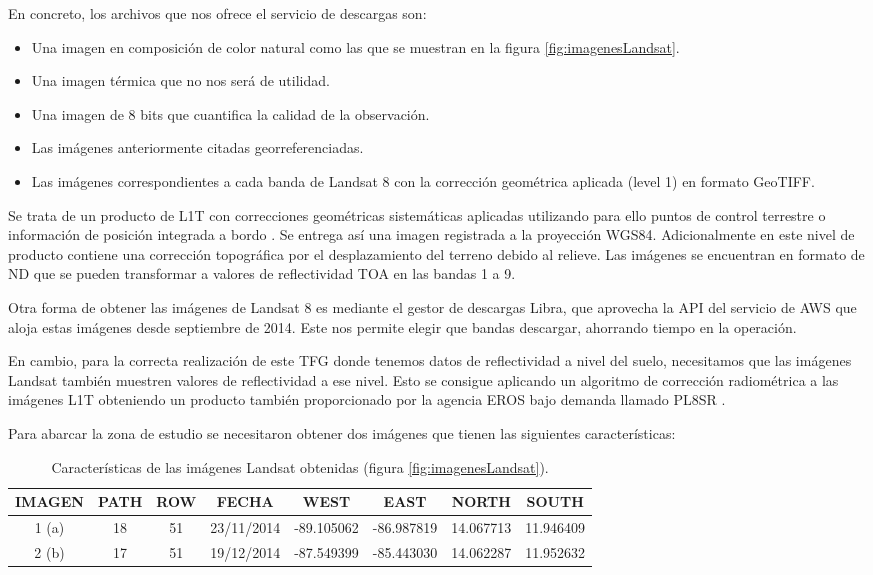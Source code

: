 En concreto, los archivos que nos ofrece el servicio de descargas son:

\begin{itemize}
	\item Una imagen en composición de color natural como las que se muestran en la figura \ref{fig:imagenesLandsat}.
	\item Una imagen térmica que no nos será de utilidad.
	\item Una imagen de 8 bits que cuantifica la calidad de la observación.
	\item Las imágenes anteriormente citadas georreferenciadas.
	\item Las imágenes correspondientes a cada banda de Landsat 8 con la corrección geométrica aplicada (level 1) en formato GeoTIFF.
\end{itemize}\Sep

Se trata de un producto de \ac{L1T} con correcciones geométricas sistemáticas aplicadas utilizando para ello puntos de control terrestre o información de posición integrada a bordo \citep{Ariza2013}. Se entrega así una imagen registrada a la proyección WGS84. Adicionalmente en este nivel de producto contiene una corrección topográfica por el desplazamiento del terreno debido al relieve. Las imágenes se encuentran en formato de \ac{ND} que se pueden transformar a valores de reflectividad \ac{TOA} en las bandas 1 a 9.\Sep

Otra forma de obtener las imágenes de Landsat 8 es mediante el gestor de descargas Libra, que aprovecha la API del servicio de \ac{AWS} que aloja estas imágenes desde septiembre de 2014. Este nos permite elegir que bandas descargar, ahorrando tiempo en la operación.\Sep

En cambio, para la correcta realización de este \ac{TFG} donde tenemos datos de reflectividad a nivel del suelo, necesitamos que las imágenes Landsat también muestren valores de reflectividad a ese nivel. Esto se consigue aplicando un algoritmo de corrección radiométrica a las imágenes \ac{L1T} obteniendo un producto también proporcionado por la agencia \ac{EROS} bajo demanda llamado \ac{PL8SR} \citep{USGS2015}.\Sep

Para abarcar la zona de estudio se necesitaron obtener dos imágenes que tienen las siguientes características:

\begin{table}[ht]
	\centering
	\caption[Caracerísticas de las imágenes Landsat]{Características de las imágenes Landsat obtenidas (figura \ref{fig:imagenesLandsat}).}
	\begin{tabular}{|c|c|c|c|c|c|c|c|}
	\hline
	IMAGEN & PATH & ROW & FECHA & WEST & EAST & NORTH & SOUTH \\
	\hline
	1 (a) & 18 & 51 & 23/11/2014 & -89.105062 & -86.987819 & 14.067713 & 11.946409 \\
	\hline
	2 (b) & 17 & 51 & 19/12/2014 & -87.549399 & -85.443030 & 14.062287 & 11.952632 \\
	\hline
	\end{tabular}
	\label{tab:imagenes}
\end{table}

